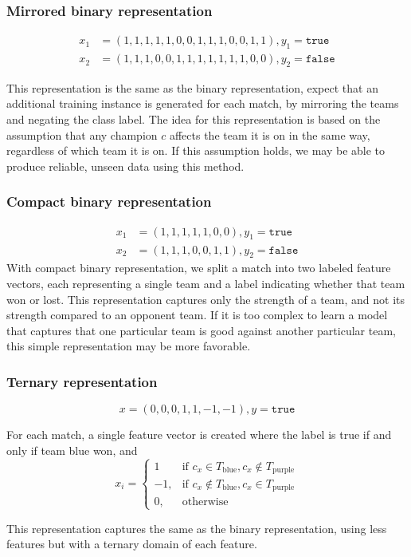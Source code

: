 \subsubsection{Mirrored binary representation}

\begin{align*}
  x_1 &= (1,1,1,1,1,0,0,1,1,1,0,0,1,1), y_1 = \texttt{true}\\
  x_2 &= (1,1,1,0,0,1,1,1,1,1,1,1,0,0), y_2 = \texttt{false}
\end{align*}

This representation is the same as the binary representation, expect that an additional training instance is generated for each match, by mirroring the teams and negating the class label.
The idea for this representation is based on the assumption that any champion $c$ affects the team it is on in the same way, regardless of which team it is on.
If this assumption holds, we may be able to produce reliable, unseen data using this method.

\subsubsection{Compact binary representation}
\begin{align*}
  x_1 &= (1,1,1,1,1,0,0), y_1 = \texttt{true} \\
  x_2 &= (1,1,1,0,0,1,1), y_2 =\texttt{false}
\end{align*}
With compact binary representation, we split a match into two labeled feature vectors, each representing a single team and a label indicating whether that team won or lost.
This representation captures only the strength of a team, and not its strength compared to an opponent team.
If it is too complex to learn a model that captures that one particular team is good against another particular team, this simple representation may be more favorable.

\subsubsection{Ternary representation}

\[x = (0,0,0,1,1,-1,-1), y = \texttt{true}\]

For each match, a single feature vector is created where the label is true if and only if team blue won, and
\[
    x_i = 
\begin{cases}
    1 				 & \text{if } c_x \in T_\text{blue}, c_x \not\in T_\text{purple}\\
    -1,              & \text{if } c_x \not\in T_\text{blue}, c_x \in T_\text{purple}\\
    0,              & \text{otherwise}
\end{cases}
\]

This representation captures the same as the binary representation, using less features but with a ternary domain of each feature.